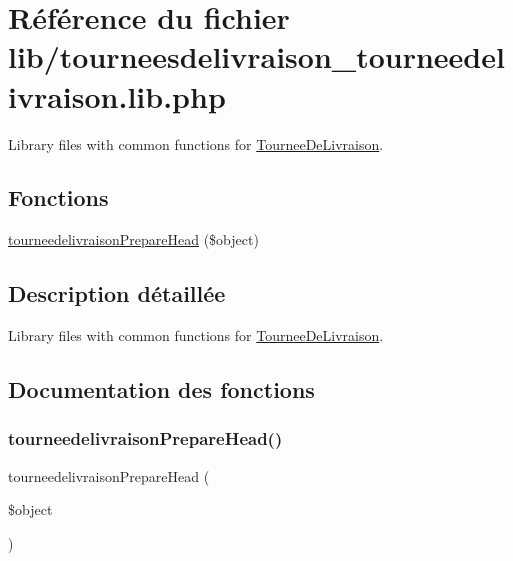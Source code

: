 \hypertarget{tourneesdelivraison__tourneedelivraison_8lib_8php}{}\section{Référence du fichier lib/tourneesdelivraison\+\_\+tourneedelivraison.lib.\+php}
\label{tourneesdelivraison__tourneedelivraison_8lib_8php}


Library files with common functions for \hyperlink{classTourneeDeLivraison}{Tournee\+De\+Livraison}.  


\subsection*{Fonctions}
\begin{DoxyCompactItemize}
\item 
\hyperlink{tourneesdelivraison__tourneedelivraison_8lib_8php_ad5a4500b2065204afe6d468f68814068}{tourneedelivraison\+Prepare\+Head} (\$object)
\end{DoxyCompactItemize}


\subsection{Description détaillée}
Library files with common functions for \hyperlink{classTourneeDeLivraison}{Tournee\+De\+Livraison}. 



\subsection{Documentation des fonctions}
\mbox{\label{tourneesdelivraison__tourneedelivraison_8lib_8php_ad5a4500b2065204afe6d468f68814068}} 
\subsubsection{\texorpdfstring{tourneedelivraison\+Prepare\+Head()}{tourneedelivraisonPrepareHead()}}
{\footnotesize\ttfamily tourneedelivraison\+Prepare\+Head (\begin{DoxyParamCaption}\item[{}]{\$object }\end{DoxyParamCaption})}

